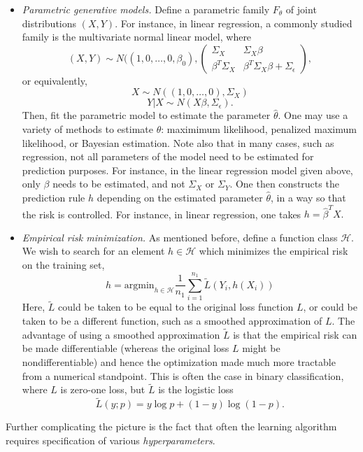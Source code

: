 \begin{itemize}
\item \emph{Parametric generative models.}  Define a parametric family
  $F_\theta$ of joint distributions $(X, Y)$.  For instance, in linear
  regression, a commonly studied family is the multivariate normal linear model,
  where
\[
(X, Y) \sim N((1,0,\hdots,0, \beta_0), \begin{pmatrix}\Sigma_X & \Sigma_X \beta \\
\beta^T \Sigma_X & \beta^T \Sigma_X \beta + \Sigma_\epsilon\end{pmatrix},
\]
or equivalently,
\[
X \sim N((1,0,\hdots,0), \Sigma_X)
\]
\[
Y|X \sim N(X \beta, \Sigma_\epsilon).
\]
Then, fit the parametric model to estimate the parameter
$\hat{\theta}$.  One may use a variety of methods to estimate
$\theta$: maximimum likelihood, penalized maximum likelihood, or
Bayesian estimation.  Note also that in many cases, such as
regression, not all parameters of the model need to be estimated for
prediction purposes.  For instance, in the linear regression model
given above, only $\beta$ needs to be estimated, and not $\Sigma_X$ or
$\Sigma_Y$.  One then constructs the prediction rule $h$ depending on
the estimated parameter $\hat{\theta}$, in a way so that the risk is
controlled.  For instance, in linear regression, one takes $h =
\hat{\beta}^T X.$
\item \emph{Empirical risk minimization.} As mentioned before, define
  a function class $\mathcal{H}$.  We wish to search for an element $h
  \in \mathcal{H}$ which minimizes the empirical risk on the training
  set,
\[
h = \text{argmin}_{h \in \mathcal{H}} \frac{1}{n_1} \sum_{i=1}^{n_1} \tilde{L}(Y_i, h(X_i))
\]
Here, $\tilde{L}$ could be taken to be equal to the original loss
function $L$, or could be taken to be a different function, such as a
smoothed approximation of $L$.  The advantage of using a smoothed
approximation $\tilde{L}$ is that the empirical risk can be made
differentiable (whereas the original loss $L$ might be
nondifferentiable) and hence the optimization made much more tractable
from a numerical standpoint.  This is often the case in binary
classification, where $L$ is zero-one loss, but $\tilde{L}$ is the logistic loss
\[
\tilde{L}(y; p) = y \log p + (1-y) \log (1-p).
\]
\end{itemize}
Further complicating the picture is the fact that often the learning
algorithm requires specification of various \emph{hyperparameters}.
